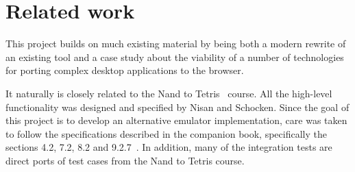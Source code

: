 \section{Related work}

This project builds on much existing material by being both a modern rewrite of an existing tool and a case study about the viability of a number of technologies for porting complex desktop applications to the browser.

It naturally is closely related to the Nand to Tetris~\cite{n2tweb} course. All the high-level functionality was designed and specified by Nisan and Schocken.
Since the goal of this project is to develop an alternative emulator implementation, care was taken to follow the specifications described in the companion book, specifically the sections 4.2, 7.2, 8.2 and 9.2.7~\cite{nisan2005}.
In addition, many of the integration tests are direct ports of test cases from the Nand to Tetris course.


